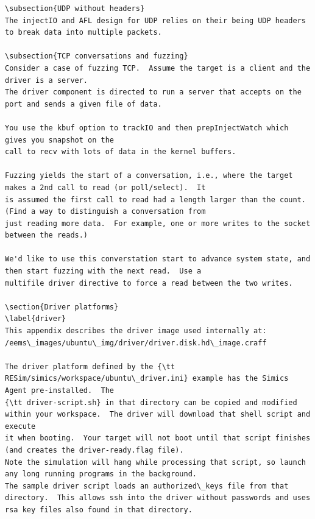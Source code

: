 \documentclass[titlepage]{article}
\begin{document}
\begin{appendices}
\begin {verbatim}
\subsection{UDP without headers}
The injectIO and AFL design for UDP relies on their being UDP headers to break data into multiple packets.

\subsection{TCP conversations and fuzzing}
Consider a case of fuzzing TCP.  Assume the target is a client and the driver is a server.
The driver component is directed to run a server that accepts on the port and sends a given file of data.

You use the kbuf option to trackIO and then prepInjectWatch which gives you snapshot on the
call to recv with lots of data in the kernel buffers.

Fuzzing yields the start of a conversation, i.e., where the target makes a 2nd call to read (or poll/select).  It
is assumed the first call to read had a length larger than the count.  (Find a way to distinguish a conversation from
just reading more data.  For example, one or more writes to the socket between the reads.)

We'd like to use this converstation start to advance system state, and then start fuzzing with the next read.  Use a 
multifile driver directive to force a read between the two writes.

\section{Driver platforms}
\label{driver}
This appendix describes the driver image used internally at: /eems\_images/ubuntu\_img/driver/driver.disk.hd\_image.craff

The driver platform defined by the {\tt RESim/simics/workspace/ubuntu\_driver.ini} example has the Simics Agent pre-installed.  The
{\tt driver-script.sh} in that directory can be copied and modified within your workspace.  The driver will download that shell script and execute
it when booting.  Your target will not boot until that script finishes (and creates the driver-ready.flag file).
Note the simulation will hang while processing that script, so launch any long running programs in the background.
The sample driver script loads an authorized\_keys file from that directory.  This allows ssh into the driver without passwords and uses
rsa key files also found in that directory.


\end{verbatim}
\end{appendices}
\end{document}
